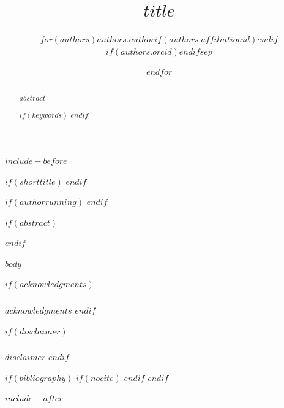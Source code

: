 \documentclass[runningheads]{llncs}
\begin{document}
$include-before$

%
\title{$title$}
$if(shorttitle)$
$endif$
%
%
\author{$for(authors)$$authors.author$$if(authors.affiliationid)$$endif$$if(authors.orcid)$$endif$$sep$\and $endfor$}
%
$if(authorrunning)$
$endif$
%

%
\maketitle              %
%
$if(abstract)$
\begin{abstract}
$abstract$

$if(keywords)$
$endif$
\end{abstract}
$endif$
%
%
%

$body$


\begin{credits}
$if(acknowledgments)$
\subsubsection{\ackname}
$acknowledgments$
$endif$

$if(disclaimer)$
\subsubsection{\discintname}
$disclaimer$
$endif$
\end{credits}

%
%
%
$if(bibliography)$
$if(nocite)$
\nocite{*}
$endif$
%
%
\printbibliography
$endif$

$include-after$
\end{document}
